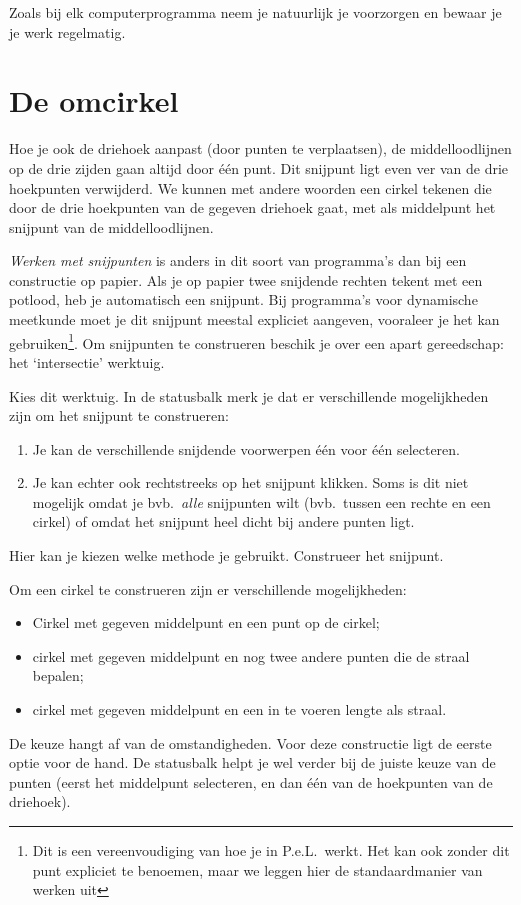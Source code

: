 Zoals bij elk computerprogramma neem je natuurlijk je voorzorgen en bewaar je je werk regelmatig. 

\section{De omcirkel}
Hoe je ook de driehoek aanpast (door punten te verplaatsen), de middelloodlijnen op de drie zijden gaan altijd door \'{e}\'{e}n punt. Dit snijpunt ligt even ver van de drie hoekpunten verwijderd. We kunnen met andere woorden een cirkel tekenen die door de drie hoekpunten van de gegeven driehoek gaat, met als middelpunt het snijpunt van de middelloodlijnen.

\emph{Werken met snijpunten} is anders in dit soort van programma's dan bij een constructie op papier. Als je op papier twee snijdende rechten tekent met een potlood, heb je automatisch een snijpunt. Bij programma's voor dynamische meetkunde moet je dit snijpunt meestal expliciet aangeven, vooraleer je het kan gebruiken\footnote{Dit is een vereenvoudiging van hoe je in P.e.L.\ werkt. Het kan ook zonder dit punt expliciet te benoemen, maar we leggen hier de standaardmanier van werken uit}. Om snijpunten te construeren beschik je over een apart gereedschap: het `intersectie' werktuig.

Kies dit werktuig. In de statusbalk merk je dat er verschillende mogelijkheden zijn om het snijpunt te construeren:
\begin{enumerate}
\item Je kan de verschillende snijdende voorwerpen \'{e}\'{e}n voor \'{e}\'{e}n selecteren.
\item Je kan echter ook rechtstreeks op het snijpunt klikken. Soms is dit niet mogelijk omdat je bvb.\ \emph{alle} snijpunten wilt (bvb.\ tussen een rechte en een cirkel) of omdat het snijpunt heel dicht bij andere punten ligt.
\end{enumerate}
Hier kan je kiezen welke methode je gebruikt. Construeer het snijpunt.

Om een cirkel te construeren zijn er verschillende mogelijkheden:
\begin{itemize}
\item Cirkel met gegeven middelpunt en een punt op de cirkel;
\item cirkel met gegeven middelpunt  en nog twee andere punten die de straal bepalen;
\item cirkel met gegeven middelpunt en een in te voeren lengte als straal.
\end{itemize}
De keuze hangt af van de omstandigheden. Voor deze constructie ligt de eerste optie voor de hand. De statusbalk helpt je wel verder bij de juiste keuze van de punten (eerst het middelpunt selecteren, en dan \'{e}\'{e}n van de hoekpunten van de driehoek).


